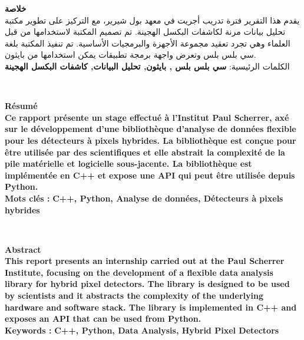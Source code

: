 \documentclass[oneside,12pt]{Classes/aesm_edspia}
\begin{document}
\setlength{\parindent}{0pt}
\setlength{\topmargin}{0mm}
\setlength{\headheight}{0cm} 
\setlength{\headsep}{0cm}
\setlength{\textheight}{20cm}
\setlength{\textwidth}{17cm} 
\setlength{\marginparsep}{0cm} 
\setlength{\marginparwidth}{0cm}
\setlength{\headheight}{0cm} 
\setlength{\footskip}{0cm}

\pagestyle{fancy}


\begin{center}
\hbox{\raisebox{0.2em}{\vrule depth 0pt height 1pt width 17cm}}
\end{center}
\begin{minipage}[c]{\textwidth}
  \textbf{خلاصة}\\ [0.4cm]
\footnotesize 
يقدم هذا التقرير  فترة تدريب أجريت في معهد بول شيرير، مع التركيز على تطوير مكتبة تحليل بيانات مرنة لكاشفات البكسل الهجينة. تم تصميم المكتبة لاستخدامها من قبل العلماء وهي تجرد تعقيد مجموعة الأجهزة والبرمجيات الأساسية. تم تنفيذ المكتبة بلغة سي بلس بلس وتعرض واجهة برمجة تطبيقات يمكن استخدامها من بايثون. \\[0.4cm]
الكلمات الرئيسية:
\textbf{سي بلس بلس , بايثون, تحليل البيانات, كاشفات البكسل الهجينة}
\end{minipage}
\\[1.5cm]
\begin{center}
\hbox{\raisebox{0.2em}{\vrule depth 0pt height 1pt width 17cm}}
\end{center}
\begin{minipage}[c]{\textwidth}
\textbf{Résumé}\\[0.4cm]
\footnotesize
\textbf{Ce rapport présente un stage effectué à l'Institut Paul Scherrer, axé sur le développement d'une bibliothèque d'analyse de données flexible pour les détecteurs à pixels hybrides. La bibliothèque est conçue pour être utilisée par des scientifiques et elle abstrait la complexité de la pile matérielle et logicielle sous-jacente. La bibliothèque est implémentée en C++ et expose une API qui peut être utilisée depuis Python.}  
\\[0.4cm]
\textbf{Mots clés :} \textbf{C++, Python, Analyse de données, Détecteurs à pixels hybrides}
\end{minipage}
\\[1.5cm]
\begin{center}
\hbox{\raisebox{0.2em}{\vrule depth 0pt height 1pt width 17cm}}
\end{center}
\begin{minipage}[c]{\textwidth}
\textbf{Abstract}\\[0.4cm]
\footnotesize
\textbf{
   This report presents an internship carried out at the Paul Scherrer Institute, focusing on the development of a
   flexible data analysis library for hybrid pixel detectors. The library is designed to be used by scientists and it 
   abstracts the complexity of the underlying hardware and software stack. The library is implemented in C++ and
   exposes an API that can be used from Python.  
 }
\\[0.4cm]
\textbf{Keywords :} \textbf{C++, Python, Data Analysis, Hybrid Pixel Detectors}
\end{minipage}%

\renewcommand{\footrulewidth}{1pt}
\fancyfoot[L]{}
\fancyfoot[R]{}
\end{document}

